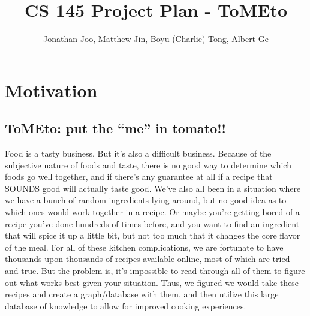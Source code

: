 
\title{CS 145 Project Plan - ToMEto}
\author{Jonathan Joo, Matthew Jin, Boyu (Charlie) Tong, Albert Ge}

\linespread{1.5}



\maketitle

\section{Motivation}
\subsection*{ToMEto: put the ``me'' in tomato!!}

Food is a tasty business. But it's also a difficult business. Because of the subjective nature of foods and taste, there is no good way to determine which foods go well together, and if there's any guarantee at all if a recipe that SOUNDS good will actually taste good. We've also all been in a situation where we have a bunch of random ingredients lying around, but no good idea as to which ones would work together in a recipe. Or maybe you're getting bored of a recipe you've done hundreds of times before, and you want to find an ingredient that will spice it up a little bit, but not too much that it changes the core flavor of the meal. For all of these kitchen complications, we are fortunate to have thousands upon thousands of recipes available online, most of which are tried-and-true. But the problem is, it's impossible to read through all of them to figure out what works best given your situation. Thus, we figured we would take these recipes and create a graph/database with them, and then utilize this large database of knowledge to allow for improved cooking experiences.

